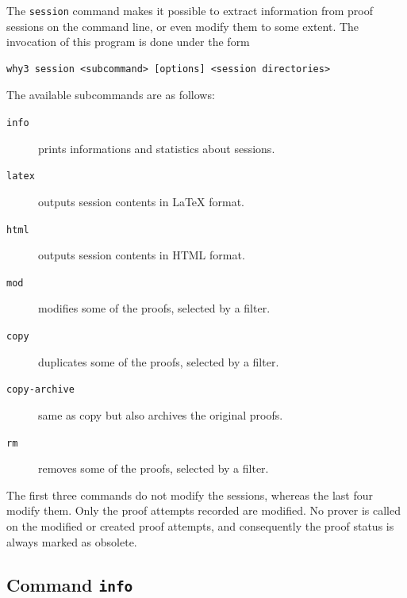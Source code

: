 The \texttt{session} command makes it possible to extract information from
proof sessions on the command line, or even modify them to some
extent. The invocation of this program is done under the form
\begin{verbatim}
why3 session <subcommand> [options] <session directories>
\end{verbatim}
The available subcommands are as follows:
\begin{description}
\item[\texttt{info}] prints informations and statistics about sessions.
\item[\texttt{latex}] outputs session contents in LaTeX format.
\item[\texttt{html}] outputs session contents in HTML format.
\item[\texttt{mod}] modifies some of the proofs, selected by a filter.
\item[\texttt{copy}] duplicates some of the proofs, selected by a filter.
\item[\texttt{copy-archive}] same as copy but also archives the
  original proofs.
\item[\texttt{rm}] removes some of the proofs, selected by a filter.
\end{description}

The first three commands do not modify the sessions, whereas the last
four modify them. Only the proof attempts recorded are modified. No
prover is called on the modified or created proof attempts, and
consequently the proof status is always marked as obsolete.

\subsection{Command \texttt{info}}

